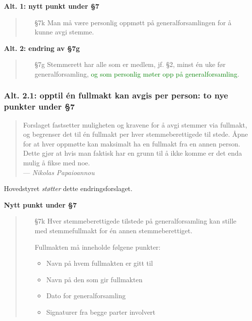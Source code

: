 \documentclass[10pt,norsk,a4paper]{article}
\begin{document}
\textbf{Alt. 1: nytt punkt under §7}
\begin{quote}
	\begin{enumerate}
		\item[§7k] Man må være personlig oppmøtt på generalforsamlingen for å kunne avgi stemme.
	\end{enumerate}
\end{quote}

\textbf{Alt. 2: endring av §7g}
\begin{quote}
    \begin{enumerate}
        \item[§7g] Stemmerett har alle som er medlem, jf. §2, minst én uke før generalforsamling,
                  \textcolor{green}{og som personlig møter opp på generalforsamling}.
    \end{enumerate}
\end{quote}

\subsubsection{Alt. 2.1: opptil én fullmakt kan avgis per person: to nye punkter under §7\label{sec:full}}

\begin{quote}
	Forslaget fastsetter muligheten og kravene for å avgi stemmer via fullmakt,
	og begrenser det til én fullmakt per hver stemmeberettigede til stede.
	Åpne for at hver oppmøtte kan maksimalt ha en fullmakt fra en annen person.
	Dette gjør at hvis man faktisk har en grunn til å ikke komme er det enda mulig å fikse med noe.\\
	--- \emph{Nikolas Papaioannou}
\end{quote}

Hovedstyret \emph{støtter} dette endringsforslaget.

\textbf{Nytt punkt under §7}


\begin{quote}
    \begin{enumerate}
        \item[§7k]
            Hver stemmeberettigede tilstede på generalforsamling kan stille med
            stemmefullmakt for én annen stemmeberettiget.

            Fullmakten må inneholde følgene punkter:
            \begin{itemize}
                \item Navn på hvem fullmakten er gitt til
                \item Navn på den som gir fullmakten
                \item Dato for generalforsamling
                \item Signaturer fra begge parter involvert
            \end{itemize}
    \end{enumerate}
\end{quote}
\end{document}
